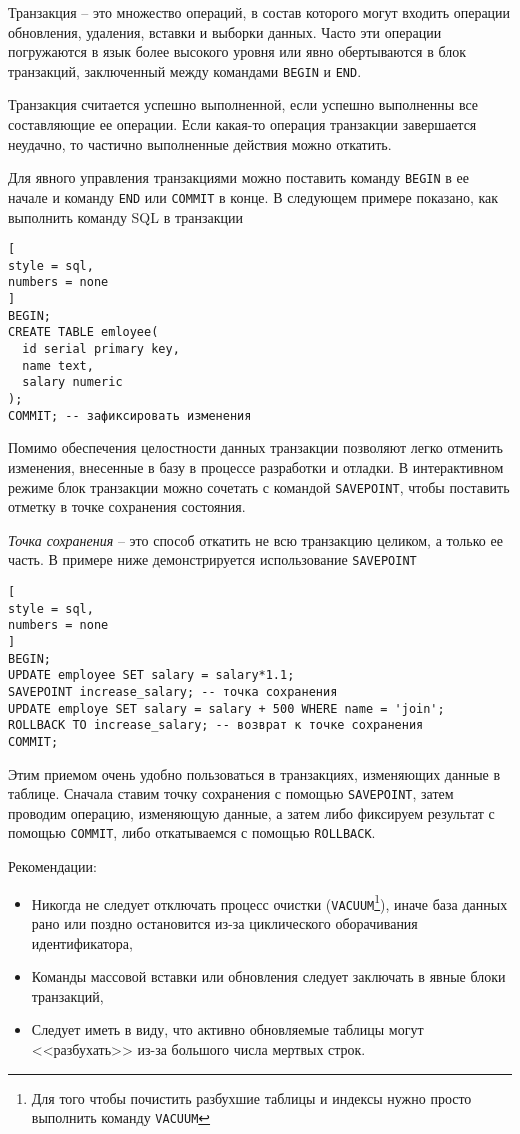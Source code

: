 \documentclass[%
	11pt,
	a4paper,
	utf8,
		]{article}
\begin{document}
Транзакция -- это множество операций, в состав которого могут входить операции обновления, удаления, вставки и выборки данных. Часто эти операции погружаются в язык более высокого уровня или явно обертываются в блок транзакций, заключенный между командами \texttt{BEGIN} и \texttt{END}.

Транзакция считается успешно выполненной, если успешно выполненны все составляющие ее операции. Если какая-то операция транзакции завершается неудачно, то частично выполненные действия можно откатить.

Для явного управления транзакциями можно поставить команду \texttt{BEGIN} в ее начале и команду \texttt{END} или \texttt{COMMIT} в конце. В следующем примере показано, как выполнить команду SQL в транзакции
\begin{lstlisting}[
style = sql,
numbers = none
]
BEGIN;
CREATE TABLE emloyee(
  id serial primary key,
  name text,
  salary numeric
);
COMMIT; -- зафиксировать изменения
\end{lstlisting}

Помимо обеспечения целостности данных транзакции позволяют легко отменить изменения, внесенные в базу в процессе разработки и отладки. В интерактивном режиме блок транзакции можно сочетать с командой \texttt{SAVEPOINT}, чтобы поставить отметку в точке сохранения состояния.

\emph{Точка сохранения} -- это способ откатить не всю транзакцию целиком, а только ее часть. В примере ниже демонстрируется использование \texttt{SAVEPOINT}

\begin{lstlisting}[
style = sql,
numbers = none
]
BEGIN;
UPDATE employee SET salary = salary*1.1;
SAVEPOINT increase_salary; -- точка сохранения
UPDATE employe SET salary = salary + 500 WHERE name = 'join';
ROLLBACK TO increase_salary; -- возврат к точке сохранения
COMMIT;
\end{lstlisting}

Этим приемом очень удобно пользоваться в транзакциях, изменяющих данные в таблице. Сначала ставим точку сохранения с помощью \texttt{SAVEPOINT}, затем проводим операцию, изменяющую данные, а затем либо фиксируем результат с помощью \texttt{COMMIT}, либо откатываемся с помощью \texttt{ROLLBACK}.

Рекомендации:
\begin{itemize}
	\item Никогда не следует отключать процесс очистки (\texttt{VACUUM}\footnote{Для того чтобы почистить разбухшие таблицы и индексы нужно просто выполнить команду \texttt{VACUUM}}), иначе база данных рано или поздно остановится из-за циклического оборачивания идентификатора,
	
	\item Команды массовой вставки или обновления следует заключать в явные блоки транзакций,
	
	\item Следует иметь в виду, что активно обновляемые таблицы могут <<разбухать>> из-за большого числа мертвых строк.
\end{itemize}
\end{document}
